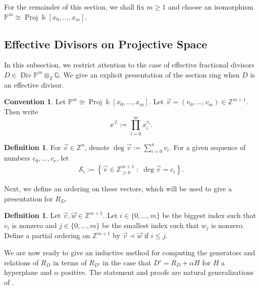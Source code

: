 \documentclass{amsart}
\theoremstyle{plain}
\theoremstyle{definition}
\newtheorem{defn}[thm]{Definition}
\newtheorem{convention}[thm]{Convention}
\theoremstyle{remark}
\numberwithin{equation}{section}
\newcommand\ssec{\subsection}
\newcommand\bq{{\mathbb Q}}
\newcommand\bp{{\mathbb P}}
\newcommand\bz{{\mathbb Z}}
\newcommand\bk{{\Bbbk}}
\DeclareMathOperator\di{Div}
\newcommand\mss{\mathscr{S}}
\DeclareMathOperator{\proj}{Proj}
\begin{document}
For the remainder of this section, we shall fix $m \geq 1$ and
choose an
isomorphism $\bp^m \cong \proj \bk[x_0, \ldots, x_m]$.


\ssec{Effective Divisors on Projective Space}
\label{ssec:proj-one-point}

In this subsection, we restrict attention to the case of effective
fractional divisors $D \in \di \bp^m \otimes_\bz \bq$. We give an explicit presentation of the section ring when $D$ is an effective
divisor.

\begin{convention}
Let $\bp^m \cong \proj \bk[x_0, \ldots, x_m]$. Let
$\vec{v} = (v_0, \ldots, v_m) \in \bz^{m + 1}$.  Then write
\[
	x^{\vec{v}} := \prod_{i = 0}^{m} x_i^{v_i}.
\]
\end{convention}

\begin{defn}
\label{defn:vec-sum}
For $\vec{v} \in \bz^n$, denote $\deg \vec{v} := \sum_{i = 0}
^n v_i$.
For a given sequence of numbers $c_0, \ldots, c_r$, let 
\begin{align*}
	\mss_i := \left \{\vec{v} \in \bz_{\geq 0}^{m + 1} \; : \;
\deg \vec v = c_i \right\}.	
\end{align*}

\noindent
\end{defn}

Next, we define an ordering on these vectors, which will be used to
give a presentation for $R_D$.

\begin{defn}
\label{defn:vec-order}
Let $\vec{v}, \vec{w} \in \bz^{m+1}$. Let $i \in \{0,\ldots, m\}$
be the biggest index such that $v_i$ is nonzero
and $j \in \{0,\ldots, m\}$ be the smallest index such that $w_j$ is
nonzero. Define a partial ordering
on $\bz^{m+1}$ by $\vec{v} \prec \vec{w}$ if $i \leq j$.
\end{defn}

We are now ready to give an inductive method for computing
the generators and relations of $R_D$ in terms of $R_{D'}$ 
in the case that $D' = R_D + \alpha H$ for $H$ a hyperplane and
$\alpha$ positive.
The statement and proofs are natural generalizations of
\cite[Theorem 6]{dorney:canonical}.
\end{document}
